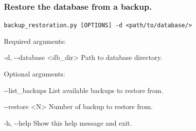 \documentclass{article}
\def\code#1{\texttt{#1}}
\begin{document}
        
        \vspace{0.5cm}
        
        \subsubsection{Restore the database from a backup.}
        \begin{description}
    
    
            \vspace{0.2cm}
            \item \code{backup\_restoration.py [OPTIONS] -d <path/to/database/>}
            \vspace{0.2cm}
        
            \begin{description}
                \item Required arguments:
                \begin{description}
                    \item -d, -\/-database \hspace{0.2cm} <db\_dir> \hspace{0.2cm} Path to database directory.
                \end{description}
                \vspace{0.2cm}
                \item Optional arguments:
                \begin{description}
                    \item -\/-list\_backups \hspace{0.2cm} List available backups to restore from.
                    \item -\/-restore \hspace{0.2cm} <N> \hspace{0.2cm} Number of backup to restore from.
                    \item -h, -\/-help \hspace{0.2cm} Show this help message and exit.
                \end{description}
            \end{description}
        \end{description}
        
        \vspace{0.5cm}
        
\end{document}
